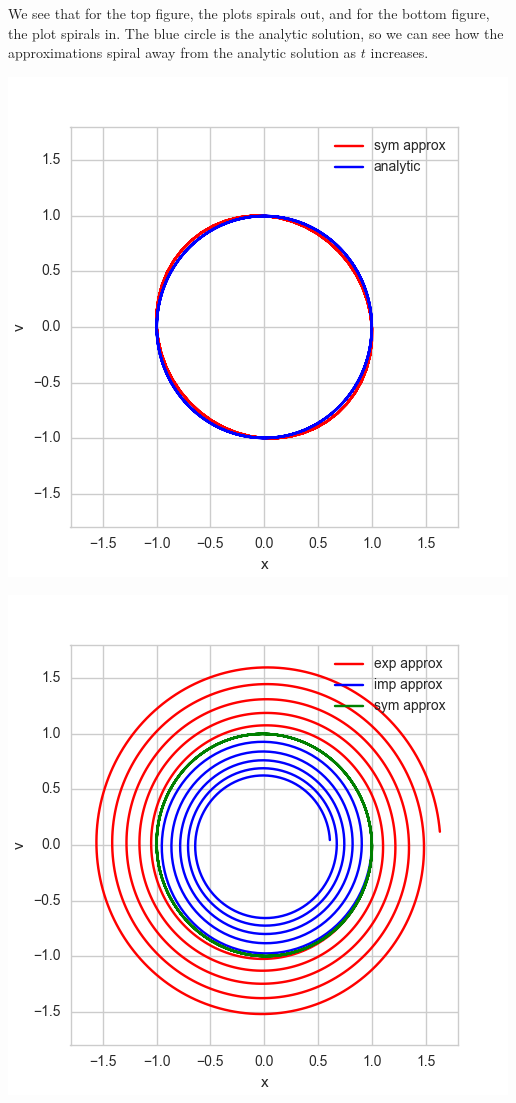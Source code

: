 \documentclass[12pt, letterpaper]{article}
\begin{document}
We see that for the top figure, the plots spirals out, and for the bottom figure, the plot spirals in. The blue circle is the analytic solution, so we can see how the approximations spiral away from the analytic solution as $t$ increases.

\begin{center}
\includegraphics[scale=0.8]{symPhaseSpace.png}
\end{center}

\begin{center}
\includegraphics[scale=0.8]{allPhaseSpace.png}
\end{center}
\end{document}
